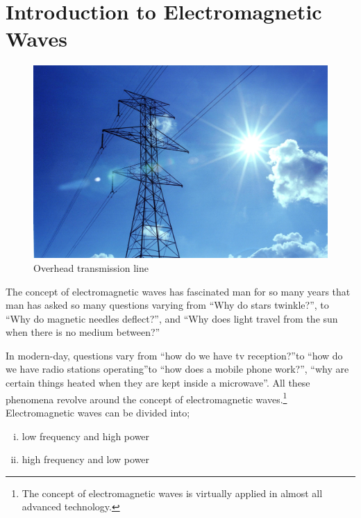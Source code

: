 \chapter{Introduction to Electromagnetic Waves}\label{lec:lec1}

\begin{figure}[h]
\centering
\includegraphics[width=1\linewidth]{./graphics/transmission1}
\caption{Overhead transmission line}
\end{figure}


The concept of electromagnetic waves has fascinated man for so many years that man has asked so many questions varying from \textquotedblleft Why do stars twinkle?\textquotedblright, to \textquotedblleft Why do magnetic needles deflect?\textquotedblright, and \textquotedblleft Why does light travel from the sun when there is no medium between?\textquotedblright \newline

In modern-day, questions vary from \textquotedblleft how do we have tv reception?\textquotedblright to \textquotedblleft how do we have radio stations operating\textquotedblright to \textquotedblleft how does a mobile phone work?\textquotedblright, \textquotedblleft why are certain things heated when they are kept inside a microwave\textquotedblright. All these phenomena revolve around the concept of electromagnetic waves.\footnote{The concept of electromagnetic waves is virtually applied in almost all advanced technology.}\\

Electromagnetic waves can be divided into;
\begin{enumerate}[(i)]
\item low frequency and high power
\item high frequency and low power
\end{enumerate}

